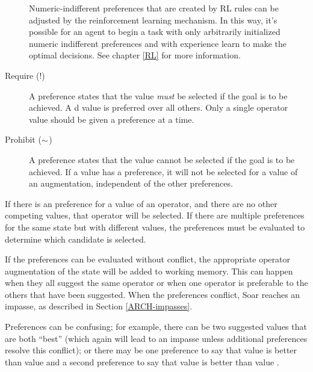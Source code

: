 \begin{description}
	Numeric-indifferent preferences that are created by RL rules can be adjusted by the reinforcement learning mechanism. In this way, it's possible for an agent to begin a task with only arbitrarily initialized numeric indifferent preferences and with experience learn to make the optimal decisions. See chapter \ref{RL} for more information.
	
\item [Require (!)] 
	A  preference states that the value \emph{must} be selected if the goal is to be achieved. A d value is preferred over all others. Only a single operator value should be given a  preference at a time.
\vspace{-8pt}

\item [Prohibit ($\sim$)] 
	A  preference states that the value cannot be selected if the goal is to be achieved.  If a value has a  preference, it will not be selected for a value of an augmentation, independent of the other preferences.
\vspace{-8pt}
\end{description}


If there is an  preference for a value of an operator, and there are no other competing values, that operator will be selected. If there are multiple  preferences for the same state but with different values, the preferences must be evaluated to determine which candidate is selected.

If the preferences can be evaluated without conflict, the appropriate operator augmentation of the state will be added to working memory. This can happen when they all suggest the same operator or when one operator is preferable to the others that have been suggested. When the preferences conflict, Soar reaches an impasse, as described in Section \ref{ARCH-impasses}.

Preferences can be confusing; for example, there can be two suggested values that are both ``best'' (which again will lead to an impasse unless additional preferences resolve this conflict); or there may be one preference to say that value  is better than value  and a second preference to say that value  is better than value .

